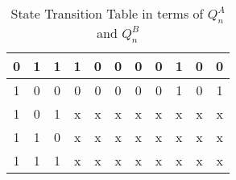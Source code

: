 \begin{table}[ht!]
\begin{tabular}{|ccc||cccccc||cc|}
		0                                                                 & 1                                      & 1                                                               & 1                            & 0                            & \multicolumn{1}{c|}{0}       & 0                            & 0                            & 1       & \multicolumn{1}{c|}{0}   & 0   \\ \hline
		1                                                                 & 0                                      & 0                                                               & 0                            & 0                            & \multicolumn{1}{c|}{0}       & 0                            & 0                            & 1       & \multicolumn{1}{c|}{0}   & 1   \\ \hline
		1                                                                 & 0                                      & 1                                                               & x                            & x                            & \multicolumn{1}{c|}{x}       & x                            & x                            & x       & \multicolumn{1}{c|}{x}   & x   \\ \hline
		1                                                                 & 1                                      & 0                                                               & x                            & x                            & \multicolumn{1}{c|}{x}       & x                            & x                            & x       & \multicolumn{1}{c|}{x}   & x   \\ \hline
		1                                                                 & 1                                      & 1                                                               & x                            & x                            & \multicolumn{1}{c|}{x}       & x                            & x                            & x       & \multicolumn{1}{c|}{x}   & x   \\ \hline
	\end{tabular}
    \caption{State Transition Table in terms of $Q^A_n$ and $Q^B_n$} \label{tab:state_transition_table_4}
\end{table}

